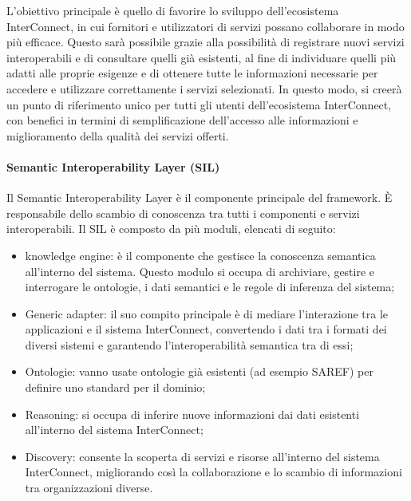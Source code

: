 L'obiettivo principale è quello di favorire lo sviluppo dell'ecosistema InterConnect, in cui fornitori e utilizzatori di servizi possano collaborare in modo più efficace. Questo sarà possibile grazie alla possibilità di registrare nuovi servizi interoperabili e di consultare quelli già esistenti, al fine di individuare quelli più adatti alle proprie esigenze e di ottenere tutte le informazioni necessarie per accedere e utilizzare correttamente i servizi selezionati. In questo modo, si creerà un punto di riferimento unico per tutti gli utenti dell'ecosistema InterConnect, con benefici in termini di semplificazione dell'accesso alle informazioni e miglioramento della qualità dei servizi offerti.


\paragraph{Semantic Interoperability Layer (SIL)}
Il Semantic Interoperability Layer è il componente principale del framework. È responsabile dello scambio di conoscenza tra tutti i componenti e servizi interoperabili.
Il SIL è composto da più moduli, elencati di seguito:
\begin{itemize}
    \item knowledge engine: è il componente che gestisce la conoscenza semantica all'interno del sistema. Questo modulo si occupa di archiviare, gestire e interrogare le ontologie, i dati semantici e le regole di inferenza del sistema;
    \item Generic adapter: il suo compito principale è di mediare l'interazione tra le applicazioni e il sistema InterConnect, convertendo i dati tra i formati dei diversi sistemi e garantendo l'interoperabilità semantica tra di essi;
    \item Ontologie: vanno usate ontologie già esistenti (ad esempio SAREF) per definire uno standard per il dominio;
    \item Reasoning: si occupa di inferire nuove informazioni dai dati esistenti all'interno del sistema InterConnect;
    \item Discovery: consente la scoperta di servizi e risorse all'interno del sistema InterConnect, migliorando così la collaborazione e lo scambio di informazioni tra organizzazioni diverse.
\end{itemize}

